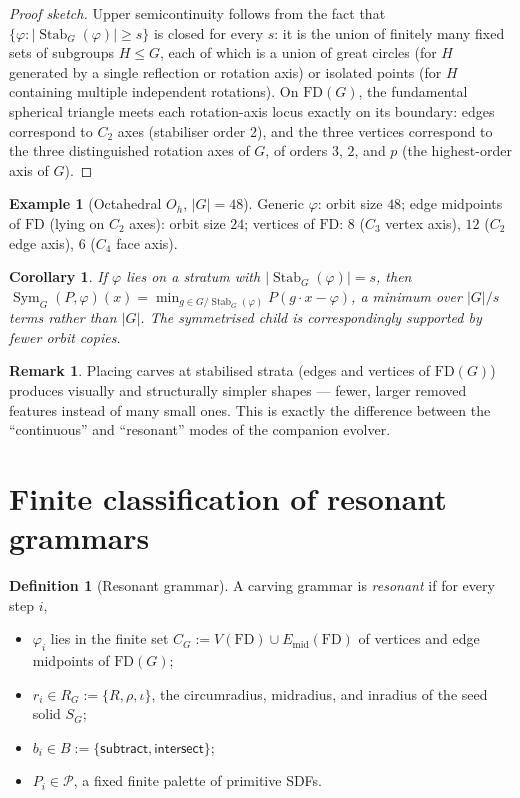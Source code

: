 \documentclass[11pt]{article}
\newtheorem{corollary}[theorem]{Corollary}
\theoremstyle{definition}
\newtheorem{definition}[theorem]{Definition}
\newtheorem{remark}[theorem]{Remark}
\newtheorem{example}[theorem]{Example}
\DeclareMathOperator{\Sym}{Sym}
\DeclareMathOperator{\Stab}{Stab}
\begin{document}
\begin{proof}[Proof sketch]
Upper semicontinuity follows from the fact that
$\{\varphi : |\Stab_G(\varphi)| \ge s\}$ is closed for every $s$: it is
the union of finitely many fixed sets of subgroups $H \le G$, each of
which is a union of great circles (for $H$ generated by a single
reflection or rotation axis) or isolated points (for $H$ containing
multiple independent rotations). On $\mathrm{FD}(G)$, the fundamental
spherical triangle meets each rotation-axis locus exactly on its
boundary: edges correspond to $C_2$ axes (stabiliser order 2), and the
three vertices correspond to the three distinguished rotation axes of
$G$, of orders $3$, $2$, and $p$ (the highest-order axis of $G$).
\end{proof}

\begin{example}[Octahedral $O_h$, $|G|=48$]
Generic $\varphi$: orbit size $48$; edge midpoints of $\mathrm{FD}$
(lying on $C_2$ axes): orbit size $24$; vertices of $\mathrm{FD}$: $8$
($C_3$ vertex axis), $12$ ($C_2$ edge axis), $6$ ($C_4$ face axis).
\end{example}

\begin{corollary}
\label{cor:reduced-orbit}
If $\varphi$ lies on a stratum with $|\Stab_G(\varphi)| = s$, then
$\Sym_G(P, \varphi)(x) = \min_{g \in G/\Stab_G(\varphi)} P(g\cdot x -
\varphi)$, a minimum over $|G|/s$ terms rather than $|G|$. The
symmetrised child is correspondingly supported by fewer orbit copies.
\end{corollary}

\begin{remark}
Placing carves at stabilised strata (edges and vertices of
$\mathrm{FD}(G)$) produces visually and structurally simpler shapes ---
fewer, larger removed features instead of many small ones. This is
exactly the difference between the ``continuous'' and ``resonant''
modes of the companion evolver.
\end{remark}

\section{Finite classification of resonant grammars}
\label{sec:resonant}

\begin{definition}[Resonant grammar]
A carving grammar is \emph{resonant} if for every step $i$,
\begin{itemize}
\item $\varphi_i$ lies in the finite set
    $C_G := V(\mathrm{FD}) \cup E_{\text{mid}}(\mathrm{FD})$
    of vertices and edge midpoints of $\mathrm{FD}(G)$;
\item $r_i \in R_G := \{R, \rho, \iota\}$, the circumradius,
    midradius, and inradius of the seed solid $S_G$;
\item $b_i \in B := \{\mathsf{subtract}, \mathsf{intersect}\}$;
\item $P_i \in \mathcal{P}$, a fixed finite palette of primitive SDFs.
\end{itemize}
\end{definition}
\end{document}

